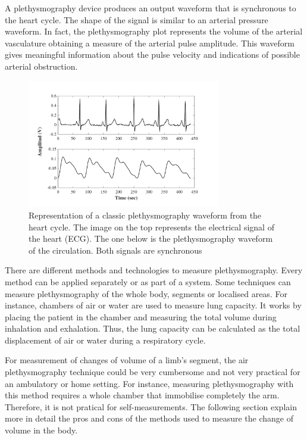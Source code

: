 A plethysmography device produces an output waveform that is synchronous to the heart cycle. The shape of the signal is similar to an arterial pressure waveform. In fact, the plethysmography plot represents the volume of the arterial vasculature obtaining a measure of the arterial pulse amplitude. This waveform gives meaningful information about the pulse velocity and indications of possible arterial obstruction.

\begin{figure}[!htpb]
	\centering
	\includegraphics[width=0.75\textwidth,keepaspectratio]{figure3}    
	\caption[Classic plethysmography waveform]{Representation of a classic plethysmography waveform from the heart cycle. The image on the top represents the electrical signal of the heart (ECG). The one below is the plethysmography waveform of the circulation. Both signals are synchronous}
	\label{fig:plethysmography}
\end{figure}

There are different methods and technologies to measure plethysmography. Every method can be applied separately or as part of a system. Some techniques can measure plethysmography of the whole body, segments or localised areas. For instance, chambers of air or water are used to measure lung capacity. It works by placing the patient in the chamber and measuring the total volume during inhalation and exhalation. Thus, the lung capacity can be calculated as the total displacement of air or water during a respiratory cycle. 

For measurement of changes of volume of a limb's segment, the air plethysmography technique could be very cumbersome and not very practical for an ambulatory or home setting. For instance, measuring plethysmography with this method requires a whole chamber that immobilise completely the arm. Therefore, it is not pratical for self-measurements. The following section explain more in detail the pros and cons of the methods used to measure the change of volume in the body.

